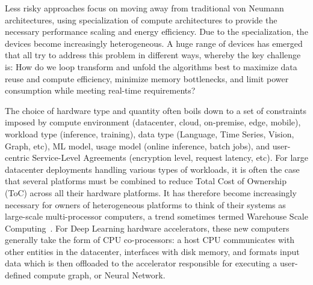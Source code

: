 

Less risky approaches focus on moving away from traditional von Neumann architectures, using specialization of compute architectures to provide the necessary performance scaling and energy efficiency. 
Due to the specialization, the devices become increasingly heterogeneous.
A huge range of devices has emerged that all try to address this problem in different ways, whereby the key challenge is:
How do we loop transform and unfold the algorithms best to maximize data reuse and compute efficiency, minimize memory bottlenecks, and limit power consumption while meeting real-time requirements? 

The choice of hardware type and quantity often boils down to a set of constraints imposed by compute environment (datacenter, cloud, on-premise, edge, mobile), workload type (inference, training), data type (Language, Time Series, Vision, Graph, etc), ML model, usage model (online inference, batch jobs), and user-centric Service-Level Agreements (encryption level, request latency, etc). For large datacenter deployments handling various types of workloads, it is often the case that several platforms must be combined to reduce Total Cost of Ownership (ToC) across all their hardware platforms. It has therefore become increasingly necessary for owners of heterogeneous platforms to think of their systems as large-scale multi-processor computers, a trend sometimes termed Warehouse Scale Computing~\cite{wsc}. For Deep Learning hardware accelerators, these new computers generally take the form of CPU co-processors: a host CPU communicates with other entities in the datacenter, interfaces with disk memory, and formats input data which is then offloaded to the accelerator responsible for executing a user-defined compute graph, or Neural Network. 

